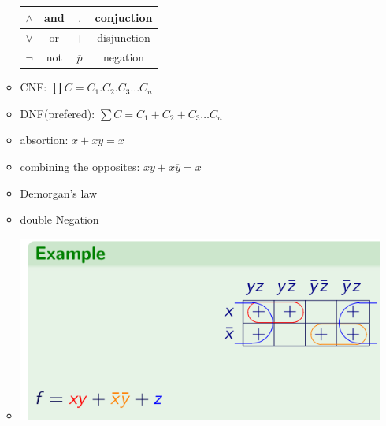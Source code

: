 \documentclass[11pt, a4paper]{article}
\begin{document}
\begin{multicols}{3}
\begin{enumerate}
\begin{itemize}
                \begin{tabular}{|c|c|c|c|}
                    \hline
                    $\land$ & and & $.$ & conjuction\\
                    \hline
                    $\lor$ & or & + & disjunction\\
                    \hline
                    $\lnot$ & not & $\overline p$ & negation\\
                    \hline
                \end{tabular}
                \item CNF: $\prod C = C_1.C_2.C_3 \dots C_n$ 
                \item DNF(prefered): $\sum C = C_1+C_2+C_3 \dots C_n$ 
                \item absortion: $x + xy =x$
                \item combining the opposites: $xy + x\overline y = x$
                \item Demorgan's law
                \item double Negation
                \item
                    \includegraphics[scale = 0.3]{Kmap}
            \end{itemize}
    \end{enumerate}


\end{multicols}
\end{document}
